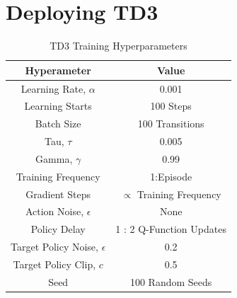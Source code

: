 \section{Deploying TD3}
% 
\begin{table}[tb!]
\caption{TD3 Training Hyperparameters}
\begin{center}
\vspace{-12pt}
\begin{tabular}{c c}
\textbf{Hyperameter}            & \textbf{Value}                  \\
\hline
\hline
Learning Rate, $\alpha$         & 0.001                           \\
Learning Starts                 & 100 Steps                       \\
Batch Size                      & 100 Transitions                 \\
Tau, $\tau$                     & 0.005                           \\
Gamma, $\gamma$                 & 0.99                            \\
Training Frequency              & 1:Episode                       \\
Gradient Steps                  & $\propto$ Training Frequency    \\
Action Noise,  $\epsilon$       & None                            \\
Policy Delay                    & 1 : 2 Q-Function Updates        \\
Target Policy Noise, $\epsilon$ & 0.2                             \\
Target Policy Clip, $c$         & 0.5                             \\
Seed                            & 100 Random Seeds                \\
\hline
\hline
\end{tabular}
\label{tab:mech_hyperparams}
\end{center}
\end{table}
%

